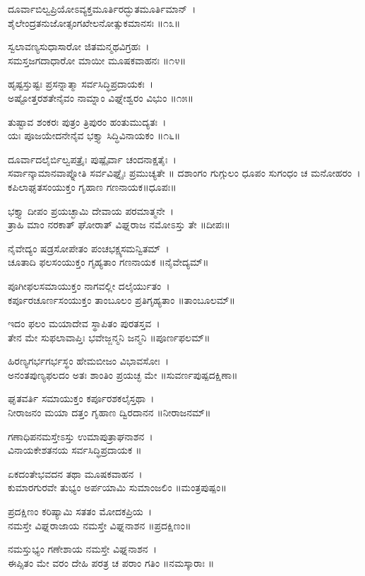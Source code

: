 ದೂರ್ವಾಬಿಲ್ವಪ್ರಿಯೋಽವ್ಯಕ್ತಮೂರ್ತಿರದ್ಭುತಮೂರ್ತಿಮಾನ್~।\\
ಶೈಲೇಂದ್ರತನುಜೋತ್ಸಂಗಖೇಲನೋತ್ಸುಕಮಾನಸಃ ॥೧೩॥

ಸ್ವಲಾವಣ್ಯಸುಧಾಸಾರೋ ಜಿತಮನ್ಮಥವಿಗ್ರಹಃ~।\\
ಸಮಸ್ತಜಗದಾಧಾರೋ ಮಾಯೀ ಮೂಷಕವಾಹನಃ ॥೧೪॥

ಹೃಷ್ಟಸ್ತುಷ್ಟಃ ಪ್ರಸನ್ನಾತ್ಮಾ ಸರ್ವಸಿದ್ಧಿಪ್ರದಾಯಕಃ~।\\
ಅಷ್ಟೋತ್ತರಶತೇನೈವಂ ನಾಮ್ನಾಂ ವಿಘ್ನೇಶ್ವರಂ ವಿಭುಂ ॥೧೫॥

ತುಷ್ಟಾವ ಶಂಕರಃ ಪುತ್ರಂ ತ್ರಿಪುರಂ ಹಂತುಮುದ್ಯತಃ~।\\
ಯಃ ಪೂಜಯೇದನೇನೈವ ಭಕ್ತ್ಯಾ ಸಿದ್ಧಿವಿನಾಯಕಂ ॥೧೬॥

ದೂರ್ವಾದಲೈರ್ಬಿಲ್ವಪತ್ರೈಃ ಪುಷ್ಪೈರ್ವಾ ಚಂದನಾಕ್ಷತೈಃ~।\\
ಸರ್ವಾನ್ಕಾಮಾನವಾಪ್ನೋತಿ ಸರ್ವವಿಘ್ನೈಃ ಪ್ರಮುಚ್ಯತೇ ॥
\newpage
ದಶಾಂಗಂ ಗುಗ್ಗುಲಂ ಧೂಪಂ ಸುಗಂಧಂ ಚ ಮನೋಹರಂ~।\\
ಕಪಿಲಾಘೃತಸಂಯುಕ್ತಂ ಗೃಹಾಣ ಗಣನಾಯಕ॥ಧೂಪಃ॥

ಭಕ್ತ್ಯಾ ದೀಪಂ ಪ್ರಯಚ್ಛಾಮಿ ದೇವಾಯ ಪರಮಾತ್ಮನೇ~।\\
ತ್ರಾಹಿ ಮಾಂ ನರಕಾತ್ ಘೋರಾತ್ ವಿಘ್ನರಾಜ ನಮೋಽಸ್ತು ತೇ ॥ದೀಪಃ॥

ನೈವೇದ್ಯಂ ಷಡ್ರಸೋಪೇತಂ ಪಂಚಭಕ್ಷ್ಯಸಮನ್ವಿತಮ್~।\\
ಚೂತಾದಿ ಫಲಸಂಯುಕ್ತಂ ಗೃಹ್ಯತಾಂ ಗಣನಾಯಕ ॥ನೈವೇದ್ಯಮ್॥

ಪೂಗೀಫಲಸಮಾಯುಕ್ತಂ ನಾಗವಲ್ಲೀ ದಲೈರ್ಯುತಂ~।\\
ಕರ್ಪೂರಚೂರ್ಣಸಂಯುಕ್ತಂ ತಾಂಬೂಲಂ ಪ್ರತಿಗೃಹ್ಯತಾಂ ॥ತಾಂಬೂಲಮ್॥

ಇದಂ ಫಲಂ ಮಯಾದೇವ ಸ್ಥಾಪಿತಂ ಪುರತಸ್ತವ~।\\
ತೇನ ಮೇ ಸುಫಲಾವಾಪ್ತಿಃ ಭವೇಜ್ಜನ್ಮನಿ ಜನ್ಮನಿ ॥ಪೂರ್ಣಫಲಮ್॥

ಹಿರಣ್ಯಗರ್ಭಗರ್ಭಸ್ಥಂ ಹೇಮಬೀಜಂ ವಿಭಾವಸೋಃ~।\\
ಅನಂತಪುಣ್ಯಫಲದಂ ಅತಃ ಶಾಂತಿಂ ಪ್ರಯಚ್ಛ ಮೇ ॥ಸುವರ್ಣಪುಷ್ಪದಕ್ಷಿಣಾ॥

ಘೃತವರ್ತಿ ಸಮಾಯುಕ್ತಂ ಕರ್ಪೂರಶಕಲೈಸ್ತಥಾ~।\\
ನೀರಾಜನಂ ಮಯಾ ದತ್ತಂ ಗೃಹಾಣ ದ್ವಿರದಾನನ ॥ನೀರಾಜನಮ್॥

ಗಣಾಧಿಪನಮಸ್ತೇಽಸ್ತು ಉಮಾಪುತ್ರಾಘನಾಶನ~।\\
ವಿನಾಯಕೇಶತನಯ ಸರ್ವಸಿದ್ಧಿಪ್ರದಾಯಕ ॥

ಏಕದಂತೇಭವದನ ತಥಾ ಮೂಷಕವಾಹನ~।\\
ಕುಮಾರಗುರವೇ ತುಭ್ಯಂ ಅರ್ಪಯಾಮಿ ಸುಮಾಂಜಲಿಂ ॥ಮಂತ್ರಪುಷ್ಪಂ॥

ಪ್ರದಕ್ಷಿಣಂ ಕರಿಷ್ಯಾಮಿ ಸತತಂ ಮೋದಕಪ್ರಿಯ~।\\
ನಮಸ್ತೇ ವಿಘ್ನರಾಜಾಯ ನಮಸ್ತೇ ವಿಘ್ನನಾಶನ ॥ಪ್ರದಕ್ಷಿಣಂ॥

ನಮಸ್ತುಭ್ಯಂ ಗಣೇಶಾಯ ನಮಸ್ತೇ ವಿಘ್ನನಾಶನ~।\\
ಈಪ್ಸಿತಂ ಮೇ ವರಂ ದೇಹಿ ಪರತ್ರ ಚ ಪರಾಂ ಗತಿಂ ॥ನಮಸ್ಕಾರಾಃ ॥

